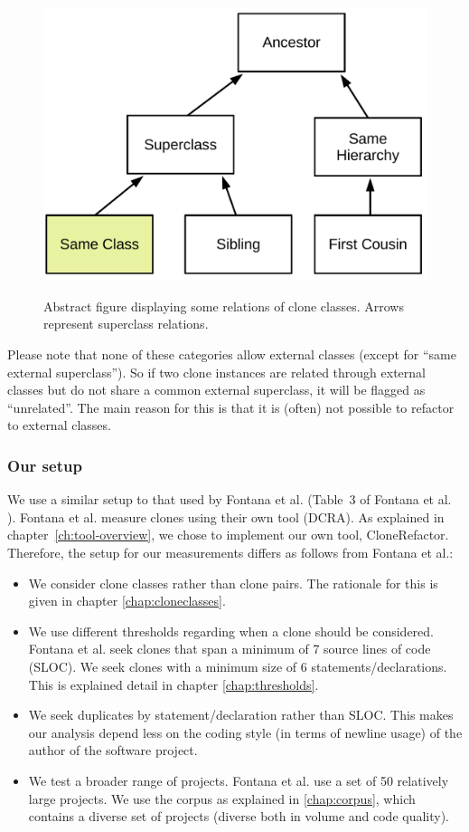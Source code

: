 \begin{figure}[H]
  \caption{Abstract figure displaying some relations of clone classes. Arrows represent superclass relations.}
    \medskip
    \centering
    \includegraphics[width=0.6\columnwidth]{img/Relation}
  \label{fig:clonerelation}
\end{figure}
Please note that none of these categories allow external classes (except for ``same external superclass''). So if two clone instances are related through external classes but do not share a common external superclass, it will be flagged as ``unrelated''. The main reason for this is that it is (often) not possible to refactor to external classes.

\subsubsection{Our setup}\label{chap:oursetup}
We use a similar setup to that used by Fontana et al. (Table~3 of Fontana et al. \cite{fontana2015duplicated}). Fontana et al. measure clones using their own tool (DCRA). As explained in chapter~\ref{ch:tool-overview}, we chose to implement our own tool, CloneRefactor. Therefore, the setup for our measurements differs as follows from Fontana et al.:
\begin{itemize}
  \item We consider clone classes rather than clone pairs. The rationale for this is given in chapter \ref{chap:cloneclasses}.
\item We use different thresholds regarding when a clone should be considered. Fontana et al. seek clones that span a minimum of 7 source lines of code (SLOC). We seek clones with a minimum size of 6 statements/declarations. This is explained detail in chapter \ref{chap:thresholds}.
\item We seek duplicates by statement/declaration rather than SLOC. This makes our analysis depend less on the coding style (in terms of newline usage) of the author of the software project.
\item We test a broader range of projects. Fontana et al. use a set of 50 relatively large projects. We use the corpus as explained in \ref{chap:corpus}, which contains a diverse set of projects (diverse both in volume and code quality).
\end{itemize}

